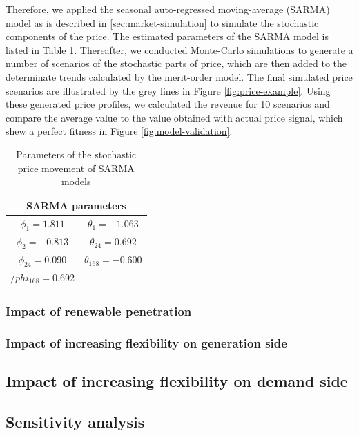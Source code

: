 Therefore, we applied the seasonal auto-regressed moving-average (SARMA) model as is described in \ref{sec:market-simulation} to simulate the stochastic components of the price. The estimated parameters of the SARMA model is listed in Table \ref{tab:SARMA}. Thereafter, we conducted Monte-Carlo simulations to generate a number of scenarios of the stochastic parts of price, which are then added to the determinate trends calculated by the merit-order model. The final simulated price scenarios are illustrated by the grey lines in Figure \ref{fig:price-example}. Using these generated price profiles, we calculated the revenue for 10 scenarios and compare the average value to the value obtained with actual price signal, which shew a perfect fitness in Figure \ref{fig:model-validation}. 

\begin{table}
	\label{tab:SARMA}
	\centering
	\begin{tabular}{|c c|}
		\hline
		\multicolumn{2}{|c|}{SARMA parameters}\\
		\hline
		\hline
		$\phi_1 = 1.811$ & $\theta_1 = -1.063$ \\
		$\phi_2 = -0.813$ & $\theta_{24} =0.692$ \\
		$\phi_{24} = 0.090$ & $\theta_{168} = -0.600$ \\
		$/phi_168 = 0.692$ & \\
		\hline
	\end{tabular}
\caption{Parameters of the stochastic price movement of SARMA models}
\end{table}

\newpage
\subsubsection{Impact of renewable penetration}

\subsubsection{Impact of increasing flexibility on generation side}

\subsection{Impact of increasing flexibility on demand side}

\subsection{Sensitivity analysis}

